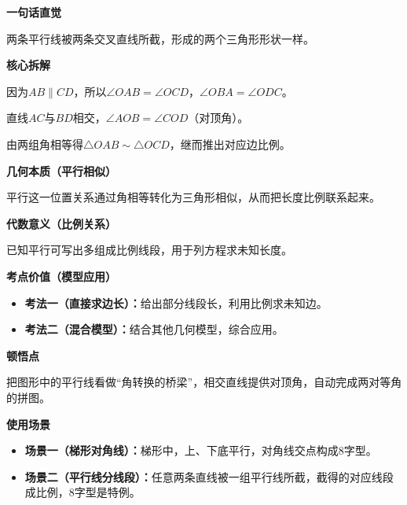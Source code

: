 \begin{explanationbox}
	\textbf{\textcolor{CExplanation}{一句话直觉}}
	\par 两条平行线被两条交叉直线所截，形成的两个三角形形状一样。

	\medskip
	\textbf{\textcolor{CExplanation}{核心拆解}}
	\begin{description}[style=nextline, leftmargin=2.8em, labelsep=0.5em, itemsep=0.45em]
		\item[\textbf{要点一（平行得等角）：}]
		      因为$AB\parallel CD$，所以$\angle OAB = \angle OCD$，$\angle OBA = \angle ODC$。
		\item[\textbf{要点二（对顶角相等）：}]
		      直线$AC$与$BD$相交，$\angle AOB = \angle COD$（对顶角）。
		\item[\textbf{要点三（两角证相似）：}]
		      由两组角相等得$\triangle OAB\sim\triangle OCD$，继而推出对应边比例。
	\end{description}

	\medskip
	\textbf{\textcolor{CExplanation}{几何本质（平行相似）}}
	\par 平行这一位置关系通过角相等转化为三角形相似，从而把长度比例联系起来。

	\medskip
	\textbf{\textcolor{CExplanation}{代数意义（比例关系）}}
	\par 已知平行可写出多组成比例线段，用于列方程求未知长度。

	\medskip
	\textbf{\textcolor{CExplanation}{考点价值（模型应用）}}
	\begin{itemize}[leftmargin=*, itemsep=0.5em, topsep=0.4em]
		\item \textbf{考法一（直接求边长）：}给出部分线段长，利用比例求未知边。
		\item \textbf{考法二（混合模型）：}结合其他几何模型，综合应用。
	\end{itemize}

	\medskip
	\textbf{\textcolor{CExplanation}{顿悟点}}
	\par 把图形中的平行线看做“角转换的桥梁”，相交直线提供对顶角，自动完成两对等角的拼图。

	\medskip
	\textbf{\textcolor{CExplanation}{使用场景}}
	\begin{itemize}[leftmargin=*, itemsep=0.5em, topsep=0.4em]
		\item \textbf{场景一（梯形对角线）：}梯形中，上、下底平行，对角线交点构成8字型。
		\item \textbf{场景二（平行线分线段）：}任意两条直线被一组平行线所截，截得的对应线段成比例，8字型是特例。
	\end{itemize}

\end{explanationbox}